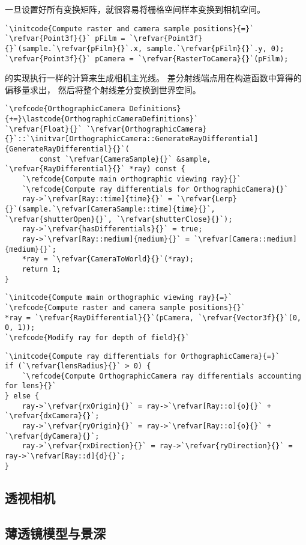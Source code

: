 一旦设置好所有变换矩阵，就很容易将栅格空间样本变换到相机空间。
\begin{lstlisting}
`\initcode{Compute raster and camera sample positions}{=}`
`\refvar{Point3f}{}` pFilm = `\refvar{Point3f}{}`(sample.`\refvar{pFilm}{}`.x, sample.`\refvar{pFilm}{}`.y, 0);
`\refvar{Point3f}{}` pCamera = `\refvar{RasterToCamera}{}`(pFilm);
\end{lstlisting}

的实现执行一样的计算来生成相机主光线。
差分射线端点用在构造函数中算得的偏移量求出，
然后将整个射线差分变换到世界空间。
\begin{lstlisting}
`\refcode{OrthographicCamera Definitions}{+=}\lastcode{OrthographicCameraDefinitions}`
`\refvar{Float}{}` `\refvar{OrthographicCamera}{}`::`\initvar[OrthographicCamera::GenerateRayDifferential]{GenerateRayDifferential}{}`(
        const `\refvar{CameraSample}{}` &sample, `\refvar{RayDifferential}{}` *ray) const {
    `\refcode{Compute main orthographic viewing ray}{}`
    `\refcode{Compute ray differentials for OrthographicCamera}{}`
    ray->`\refvar[Ray::time]{time}{}` = `\refvar{Lerp}{}`(sample.`\refvar[CameraSample::time]{time}{}`, `\refvar{shutterOpen}{}`, `\refvar{shutterClose}{}`);
    ray->`\refvar{hasDifferentials}{}` = true;
    ray->`\refvar[Ray::medium]{medium}{}` = `\refvar[Camera::medium]{medium}{}`;
    *ray = `\refvar{CameraToWorld}{}`(*ray);
    return 1;
}
\end{lstlisting}
\begin{lstlisting}
`\initcode{Compute main orthographic viewing ray}{=}`
`\refcode{Compute raster and camera sample positions}{}`
*ray = `\refvar{RayDifferential}{}`(pCamera, `\refvar{Vector3f}{}`(0, 0, 1));
`\refcode{Modify ray for depth of field}{}`
\end{lstlisting}
\begin{lstlisting}
`\initcode{Compute ray differentials for OrthographicCamera}{=}`
if (`\refvar{lensRadius}{}` > 0) {
    `\refcode{Compute OrthographicCamera ray differentials accounting for lens}{}`
} else {
    ray->`\refvar{rxOrigin}{}` = ray->`\refvar[Ray::o]{o}{}` + `\refvar{dxCamera}{}`;
    ray->`\refvar{ryOrigin}{}` = ray->`\refvar[Ray::o]{o}{}` + `\refvar{dyCamera}{}`;
    ray->`\refvar{rxDirection}{}` = ray->`\refvar{ryDirection}{}` = ray->`\refvar[Ray::d]{d}{}`;
}
\end{lstlisting}

\subsection{透视相机}\label{sub:透视相机}

\subsection{薄透镜模型与景深}\label{sub:薄透镜模型与景深}
